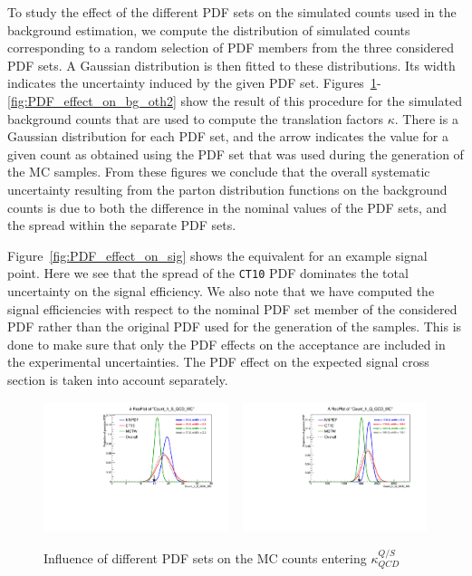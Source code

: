 To study the effect of the different PDF sets on the simulated counts used in the background
estimation, we compute the distribution of simulated counts corresponding to a random selection of
PDF members from the three considered PDF sets. 
A Gaussian distribution is then fitted to these distributions. Its width indicates the uncertainty
induced by the given PDF set. 
Figures~\ref{fig:PDF_effect_on_bg_QCD}-\ref{fig:PDF_effect_on_bg_oth2} show the result of this
procedure for the simulated background counts that are used to compute the translation factors
$\kappa$. 
There is a Gaussian distribution for each PDF set, and the arrow indicates the value for a given
count as obtained using the PDF set that was used during the generation of the MC samples. 
From these figures we conclude that the overall systematic uncertainty resulting from the parton
distribution functions on the background counts is due to both the difference in the nominal values
of the PDF sets, and the spread within the separate PDF sets.

Figure~\ref{fig:PDF_effect_on_sig} shows the equivalent for an example signal point. Here we see
that the spread of the {\tt CT10} PDF dominates the total uncertainty on the signal efficiency. 
We also note that we have computed the signal efficiencies with respect to the nominal PDF set
member of the considered PDF rather than the original PDF used for the generation of the samples.
This is done to make sure that only the PDF effects on the acceptance are included in the
experimental uncertainties. The PDF effect on the expected signal cross section is taken into
account separately.

\begin{figure}[htpb]
\centering
\includegraphics[width=0.48\textwidth,clip=true,trim=0 0.2cm 0 1.2cm]
{figures/razor_systematics/h_S_QCD_MC}
~
\includegraphics[width=0.48\textwidth,clip=true,trim=0 0.2cm 0 1.2cm]
{figures/razor_systematics/h_Q_QCD_MC}
\caption{Influence of different PDF sets on the MC counts entering $\kappa_{QCD}^{Q/S}$
\label{fig:PDF_effect_on_bg_QCD}}
\end{figure}

